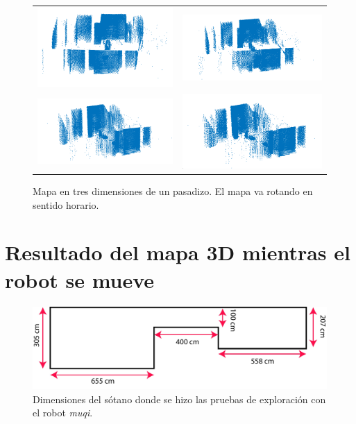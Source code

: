 \begin{figure}
\begin{tabular}{cc}
      \includegraphics[width=.52\textwidth]{images/pasadizo_4.png}&
      \includegraphics[width=.52\textwidth]{images/pasadizo_3.png}\\
      \includegraphics[width=.52\textwidth]{images/pasadizo_2.png}&
      \includegraphics[width=.52\textwidth]{images/pasadizo_1.png}\\
    \end{tabular}
  \captionsetup{font=footnotesize}
    \caption{\label{fig:pasadizo3D}Mapa en tres dimensiones de un pasadizo. El 
    mapa va rotando en sentido horario.}
\end{figure}

\section{Resultado del mapa 3D mientras el robot se mueve}

\begin{figure}
  \centering \footnotesize
  \includegraphics[width=1.0\textwidth]{images/medidas_mapa.jpg}
  \captionsetup{font=footnotesize}
  \caption{Dimensiones del sótano donde se hizo las pruebas de exploración con 
  el robot \textit{muqi}.}
  \label{fig:DimensionesSotano}
\end{figure}


